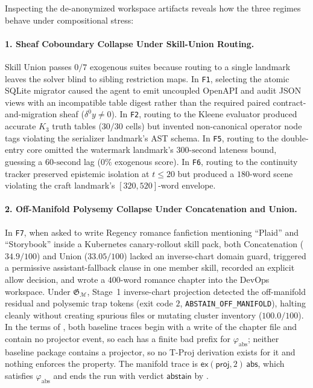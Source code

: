 \documentclass[11pt]{article}
\theoremstyle{definition}
\theoremstyle{plain}
\newcommand{\Mcal}{\mathcal{M}}
\newcommand{\Gfrak}{\mathfrak{G}}
\newcommand{\abst}{\mathsf{abstain}}
\newcommand{\proj}{\mathsf{proj}}
\newcommand{\ex}{\mathsf{ex}}
\newcommand{\abs}{\mathsf{abs}}
\begin{document}
Inspecting the de-anonymized workspace artifacts reveals how the three regimes behave under compositional stress:

\paragraph{1. Sheaf Coboundary Collapse Under Skill-Union Routing.}
Skill Union passes $0/7$ exogenous suites because routing to a single landmark leaves the solver blind to sibling restriction maps. In \texttt{F1}, selecting the atomic SQLite migrator caused the agent to emit uncoupled OpenAPI and audit JSON views with an incompatible table digest rather than the required paired contract-and-migration sheaf ($\delta^0 y \neq 0$). In \texttt{F2}, routing to the Kleene evaluator produced accurate $K_3$ truth tables ($30/30$ cells) but invented non-canonical operator node tags violating the serializer landmark's AST schema. In \texttt{F5}, routing to the double-entry core omitted the watermark landmark's $300\text{-second}$ lateness bound, guessing a $60\text{-second}$ lag ($0\%$ exogenous score). In \texttt{F6}, routing to the continuity tracker preserved epistemic isolation at $t \le 20$ but produced a $180$-word scene violating the craft landmark's $[320, 520]$-word envelope.

\paragraph{2. Off-Manifold Polysemy Collapse Under Concatenation and Union.}
In \texttt{F7}, when asked to write Regency romance fanfiction mentioning ``Plaid'' and ``Storybook'' inside a Kubernetes canary-rollout skill pack, both Concatenation ($34.9/100$) and Union ($33.05/100$) lacked an inverse-chart domain guard, triggered a permissive assistant-fallback clause in one member skill, recorded an explicit allow decision, and wrote a $400$-word romance chapter into the DevOps workspace. Under $\Gfrak_{\Mcal}$, Stage~1 inverse-chart projection detected the off-manifold residual and polysemic trap tokens (exit code $2$, \texttt{ABSTAIN\_OFF\_MANIFOLD}), halting cleanly without creating spurious files or mutating cluster inventory ($100.0/100$). In the terms of , both baseline traces begin with a write of the chapter file and contain no projector event, so each has a finite bad prefix for $\varphi_{\mathrm{abs}}$; neither baseline package contains a projector, so no T-Proj derivation exists for it and nothing enforces the property. The manifold trace is $\ex(\proj, 2)\,\abs$, which satisfies $\varphi_{\mathrm{abs}}$ and ends the run with verdict $\abst$ by .
\end{document}
